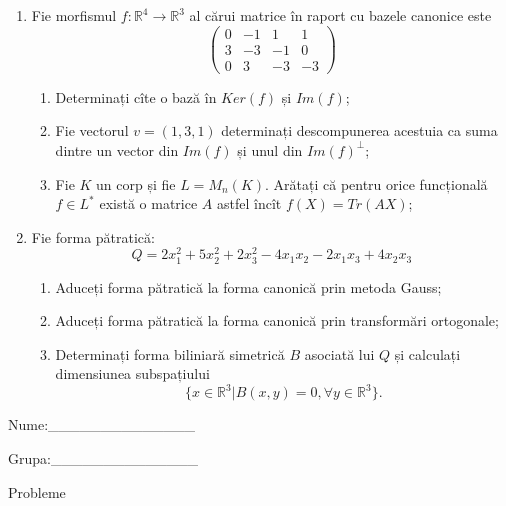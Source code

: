 \documentclass{article}
\begin{document}
\begin{enumerate}
 \item Fie morfismul $f:\mathbb{R}^4 \to \mathbb{R}^3$ al cărui matrice în raport cu bazele canonice este
$$\begin{pmatrix}
0&-1&1&1\\
3&-3&-1&0\\
0&3&-3&-3
\end{pmatrix}$$

\begin{enumerate}
\item Determinați cîte o bază în $Ker(f)$ și $Im(f)$;
\item Fie vectorul $v=(1,3,1)$ determinați descompunerea acestuia ca suma dintre un vector din $Im(f)$ și unul din $Im(f)^\perp$;
\item Fie $K$ un corp și fie $L=M_n(K)$. Arătați că pentru orice funcțională $f \in L^*$ există o matrice $A$ astfel încît $f(X)=Tr(AX)$;
\end{enumerate}
\item Fie forma pătratică:
$$Q= 2x_1^2+5x_2^2+2x_3^2-4x_1x_2-2x_1x_3+4x_2x_3$$

\begin{enumerate}
\item Aduceți forma pătratică la forma canonică prin metoda Gauss;
\item Aduceți forma pătratică la forma canonică prin transformări ortogonale;
\item Determinați forma biliniară simetrică $B$ asociată lui $Q$ și calculați dimensiunea subspațiului
$$\{x \in \mathbb{R}^3 | B(x,y)=0,\forall y \in \mathbb{R}^3\}.$$

\end{enumerate}
\end{enumerate}
\newpage
\begin{flushright}
Nume:\_\_\_\_\_\_\_\_\_\_\_\_\_\_
 
 
Grupa:\_\_\_\_\_\_\_\_\_\_\_\_\_\_
\end{flushright}
\begin{center}
\vspace{2cm}
{\Large Probleme}
\vspace{2cm}
\end{center}
\end{document}
